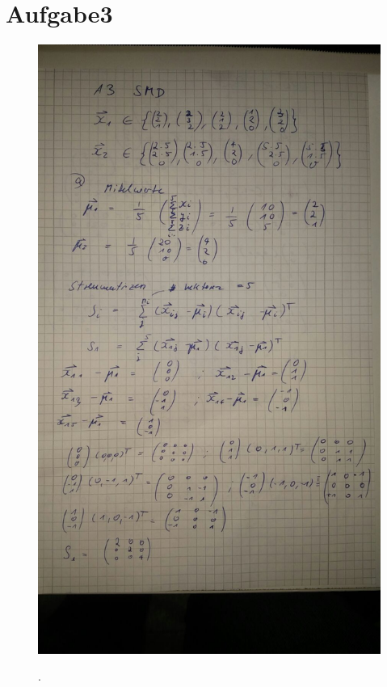 \newpage
\section{Aufgabe3}
\label{sec:a3}

\FloatBarrier
\begin{figure}
  \centering
  \includegraphics[width=\textwidth]{bild1.jpeg}
  \caption{}.
  \label{fig:1}
\end{figure}
\FloatBarrier

